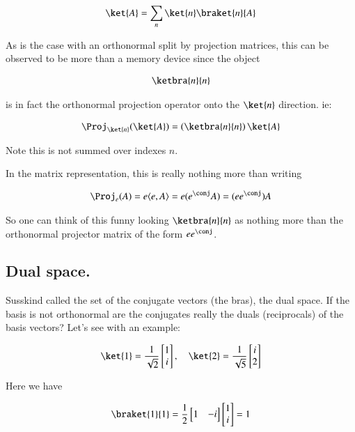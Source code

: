 \begin{align*}
\ket{A} = \sum_n \ket{n} \braket{n}{A} 
\end{align*}

As is the case with an orthonormal split by projection matrices, this can be observed to be more than a memory
device since the object

\begin{align*}
\ketbra{n}{n}
\end{align*}

is in fact the orthonormal projection operator onto the $\ket{n}$ direction.  ie:

\begin{align*}
\Proj_{\ket{n}}(\ket{A}) = \left( \ketbra{n}{n} \right) \ket{A}
\end{align*}

Note this is not summed over indexes $n$.

In the matrix representation, this is really nothing more than writing

\begin{align*}
\Proj_{e} (A) = e \innerprod{e}{A} = e (e^\conj A) = (e e^\conj) A
\end{align*}

So one can think of this funny looking $\ketbra{n}{n}$ as nothing more than the orthonormal projector matrix of the form $e e^\conj$.

\subsection{Dual space. }

Susskind called the set of the conjugate vectors (the bras), the dual space.  If the basis is not orthonormal
are the conjugates really the duals (reciprocals) of the basis vectors?  Let's see with an example:

\begin{align*}
\ket{1} = 
\inv{\sqrt{2}}
\begin{bmatrix}
1 \\
i
\end{bmatrix}
, \quad
\ket{2} = 
\inv{\sqrt{5}}
\begin{bmatrix}
i \\
2
\end{bmatrix}
\end{align*}

Here we have

\begin{align*}
\braket{1}{1} = 
\inv{2}
\begin{bmatrix}
1 & -i
\end{bmatrix}
\begin{bmatrix}
1 \\
i
\end{bmatrix}
= 1
\end{align*}

